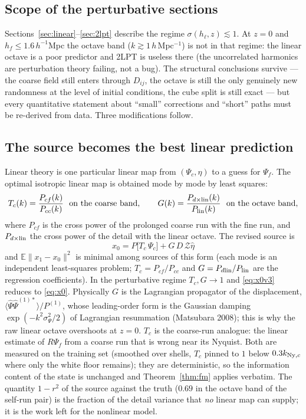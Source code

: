 \documentclass[11pt]{article}
\theoremstyle{definition}
\newcommand{\Psic}{\Psi_{c}}
\newcommand{\Psif}{\Psi_{f}}
\newcommand{\E}{\mathbb{E}}
\newcommand{\Ny}{{\rm Ny}}
\newcommand{\lin}{{\rm lin}}
\newcommand{\Zel}{\mathcal{Z}}
\begin{document}
\subsection{Scope of the perturbative sections}

Sections~\ref{sec:linear}--\ref{sec:2lpt} describe the regime $\sigma(h_\ell,z)\lesssim1$. At $z=0$ and $h_f\le1.6\,h^{-1}$Mpc the octave band ($k\gtrsim1\,h\,$Mpc$^{-1}$) is not in that regime: the linear octave is a poor predictor and 2LPT is useless there (the uncorrelated harmonics are perturbation theory failing, not a bug). The structural conclusions survive --- the coarse field still enters through $D_{ij}$, the octave is still the only genuinely new randomness at the level of initial conditions, the cube split is still exact --- but every quantitative statement about ``small'' corrections and ``short'' paths must be re-derived from data. Three modifications follow.

\subsection{The source becomes the best linear prediction}

Linear theory is one particular linear map from $(\Psic,\eta)$ to a guess for $\Psif$. The optimal isotropic linear map is obtained mode by mode by least squares:
\begin{equation}
T_c(k)=\frac{P_{cf}(k)}{P_{cc}(k)}\ \text{ on the coarse band},\qquad
G(k)=\frac{P_{d\times\lin}(k)}{P_{\lin}(k)}\ \text{ on the octave band},
\label{eq:filters}
\end{equation}
where $P_{cf}$ is the cross power of the prolonged coarse run with the fine run, and $P_{d\times\lin}$ the cross power of the detail with the linear octave. The revised source is
\begin{equation}
\boxed{\ x_0=P\big[T_c\,\Psic\big]+G\,D\,\Zel\hat\eta\ }
\label{eq:x0v3}
\end{equation}
and $\E\|x_1-x_0\|^2$ is minimal among sources of this form (each mode is an independent least-squares problem; $T_c=P_{cf}/P_{cc}$ and $G=P_{d\lin}/P_{\lin}$ are the regression coefficients). In the perturbative regime $T_c,G\to1$ and \eqref{eq:x0v3} reduces to \eqref{eq:x0}. Physically $G$ is the Lagrangian propagator of the displacement, $\langle\hat\Psi\hat\Psi^{(1)*}\rangle/P^{(1)}$, whose leading-order form is the Gaussian damping $\exp(-k^2\sigma_\Psi^2/2)$ of Lagrangian resummation (Matsubara 2008); this is why the raw linear octave overshoots at $z=0$. $T_c$ is the coarse-run analogue: the linear estimate of $R\Psif$ from a coarse run that is wrong near its Nyquist. Both are measured on the training set (smoothed over shells, $T_c$ pinned to $1$ below $0.3k_{\Ny,c}$ where only the white floor remains); they are deterministic, so the information content of the state is unchanged and Theorem~\ref{thm:fm} applies verbatim. The quantity $1-r^2$ of the source against the truth ($0.69$ in the octave band of the self-run pair) is the fraction of the detail variance that \emph{no} linear map can supply; it is the work left for the nonlinear model.
\end{document}
